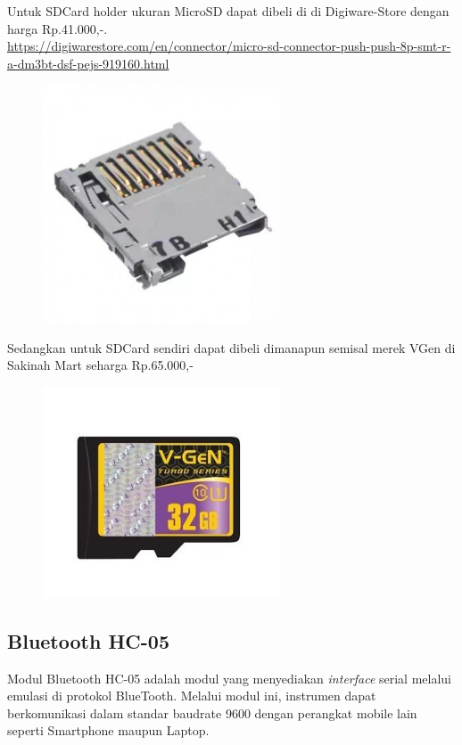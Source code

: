 \documentclass[12pt,]{article}
\begin{document}
	Untuk SDCard holder ukuran MicroSD dapat dibeli di di Digiware-Store dengan harga Rp.41.000,-.\\
	\url{https://digiwarestore.com/en/connector/micro-sd-connector-push-push-8p-smt-r-a-dm3bt-dsf-pejs-919160.html}\\
	
	\begin{figure}[!ht]
		\centering
		\includegraphics[width=200pt]{images/microsd}
	\end{figure}
	
	Sedangkan untuk SDCard sendiri dapat dibeli dimanapun semisal merek VGen di Sakinah Mart seharga Rp.65.000,-
	\begin{figure}[!ht]
		\centering
		\includegraphics[width=200pt]{images/vgensdcard}
	\end{figure}

	\newpage
	\subsection{Bluetooth HC-05}
	
	Modul Bluetooth HC-05 adalah modul yang menyediakan \textit{interface} serial melalui emulasi di protokol BlueTooth.
	Melalui modul ini, instrumen dapat berkomunikasi dalam standar baudrate 9600 dengan perangkat mobile lain seperti Smartphone maupun Laptop.
	
\end{document}
